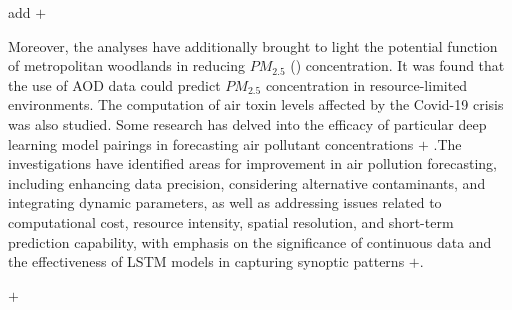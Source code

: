 \documentclass[a4paper,fleqn]{cas-dc}
\begin{document}
\par add $+$

Moreover, the analyses have additionally brought to light the potential function of metropolitan woodlands in reducing $PM_{2.5}$ (\cite{kumar2022deep}) concentration. It was found that the use of AOD data could predict $PM_{2.5}$ concentration in resource-limited environments. The computation of air toxin levels affected by the Covid-19 crisis was also studied. Some research has delved into the efficacy of particular deep learning model pairings in forecasting air pollutant concentrations  $+ $ .The investigations have identified areas for improvement in air pollution forecasting, including enhancing data precision, considering alternative contaminants, and integrating dynamic parameters, as well as addressing issues related to computational cost, resource intensity, spatial resolution, and short-term prediction capability, with emphasis on the significance of continuous data and the effectiveness of LSTM models in capturing synoptic patterns $+$.


\par $+$
\end{document}

